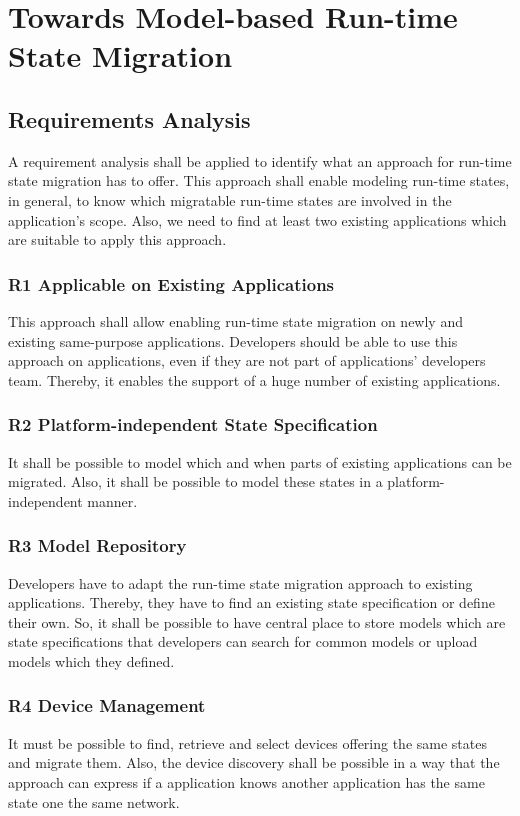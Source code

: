 \chapter{Towards Model-based Run-time State Migration}
\label{ch:requirements}

\section{Requirements Analysis}

A requirement analysis shall be applied to identify what an approach for run-time state migration has to offer. This approach shall enable modeling run-time states, in general, to know which migratable run-time states are involved in the application's scope. Also, we need to find at least two existing applications which are suitable to apply this approach.

\subsection{R1 Applicable on Existing Applications}
This approach shall allow enabling run-time state migration on newly and existing same-purpose applications. Developers should be able to use this approach on applications, even if they are not part of applications' developers team. Thereby, it enables the support of a huge number of existing applications.


\subsection{R2 Platform-independent State Specification}
It shall be possible to model which and when parts of existing applications can be migrated. Also, it shall be possible to model these states in a platform-independent manner.

\subsection{R3 Model Repository}
Developers have to adapt the run-time state migration approach to existing applications. Thereby, they have to find an existing state specification or define their own. So, it shall be possible to have central place to store models which are state specifications that developers can search for common models or upload models which they defined.

\subsection{R4 Device Management}
It must be possible to find, retrieve and select devices offering the same states and migrate them. Also, the device discovery shall be possible in a way that the approach can express if a application knows another application has the same state one the same network.




